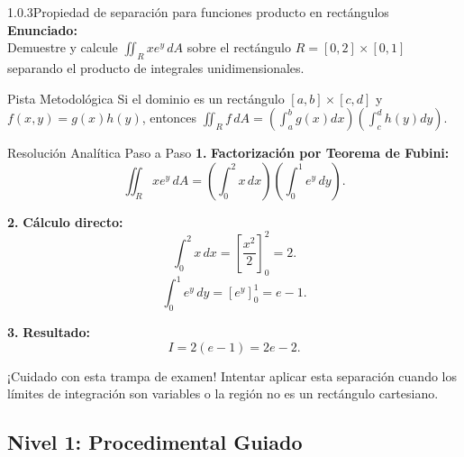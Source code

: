 \documentclass[11pt,a4paper]{article}
\begin{document}
\begin{nivelbox}{1.0.3}{Propiedad de separación para funciones producto en rectángulos}
\textbf{Enunciado:}\\
Demuestre y calcule $\iint_R x e^y \, dA$ sobre el rectángulo $R = [0, 2] \times [0, 1]$ separando el producto de integrales unidimensionales.

\begin{observacionbox}{Pista Metodológica}
Si el dominio es un rectángulo $[a,b] \times [c,d]$ y $f(x,y) = g(x)h(y)$, entonces $\iint_R f \, dA = \left(\int_a^b g(x)dx\right)\left(\int_c^d h(y)dy\right)$.
\end{observacionbox}

\begin{ejerciciobox}{Resolución Analítica Paso a Paso}
\smallskip\noindent\textbf{1.} \textbf{Factorización por Teorema de Fubini:}
\[\iint_R x e^y \, dA = \left( \int_0^2 x \, dx \right) \left( \int_0^1 e^y \, dy \right).\]

\smallskip\noindent\textbf{2.} \textbf{Cálculo directo:}
\[\int_0^2 x \, dx = \left[ \frac{x^2}{2} \right]_0^2 = 2.\]
\[\int_0^1 e^y \, dy = [e^y]_0^1 = e - 1.\]

\smallskip\noindent\textbf{3.} \textbf{Resultado:}
\[I = 2(e - 1) = 2e - 2.\]
\end{ejerciciobox}

\begin{errorbox}{¡Cuidado con esta trampa de examen!}
Intentar aplicar esta separación cuando los límites de integración son variables o la región no es un rectángulo cartesiano.
\end{errorbox}
\end{nivelbox}
\bigskip

\subsection{Nivel 1: Procedimental Guiado}
\end{document}
